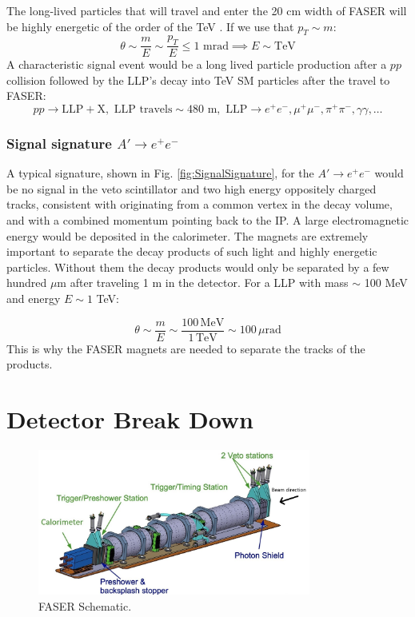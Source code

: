 The long-lived particles that will travel and enter the 20 cm width of FASER will be highly energetic of the order of the TeV \cite{faser_collaboration_faser_2019}. If we use that $p_{T}\sim m$:
\[ \theta\sim \frac{m}{E}\sim\frac{p_{T}}{E}\leq 1 \text{ mrad} \implies E\sim \text{TeV}\]
A characteristic signal event would be a long lived particle production after a $pp$ collision followed by the LLP's decay into TeV SM particles after the travel to FASER:
\[ pp \rightarrow \text{LLP} + \text{X}, \text{ LLP travels} \sim \text{480 m}, \text{ LLP} \rightarrow e^{+}e^{-}, \mu^{+}\mu^{-}, \pi^{+}\pi^{-},\gamma\gamma,\dots \]

\subsubsection{Signal signature $A'\rightarrow e^{+}e^{-}$}

A typical signature, shown in Fig. \ref{fig:SignalSignature}, for the $A'\rightarrow e^{+}e^{-}$ would be no signal in the veto scintillator and two high energy oppositely charged tracks, consistent with originating from a common vertex in the decay volume, and with a combined momentum pointing back to the IP. A large electromagnetic energy would be deposited in the calorimeter. The magnets are extremely important to separate the decay products of such light and highly energetic particles. Without them the decay products would only be separated by a few hundred $\mu$m after traveling 1 m in the detector. For a LLP with mass $\sim$ 100 MeV and energy $E\sim1$ TeV:

\[ \theta\sim\frac{m}{E}\sim\frac{100\,\text{MeV}}{1\,\text{TeV}}\sim100\,\mu\text{rad} \]
This is why the FASER magnets are needed to separate the tracks of the products.

\section{Detector Break Down}

\begin{figure}[htbp!] 
\centering    
\includegraphics[width=0.8\textwidth]{ChapterFaser/Figs/Raster/FaserSchema.jpg}  
\caption{FASER Schematic.}
\label{fig:FaserSchematic}
\end{figure}

